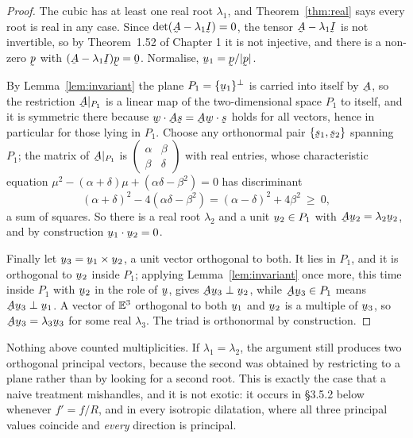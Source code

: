 \begin{proof}
The cubic  has at least one real root $\lambda_{1}$, and
Theorem~\ref{thm:real} says every root is real in any case. Since
$\det(\bA-\lambda_{1}\I)=0$, the tensor $\bA-\lambda_{1}\I$ is not
invertible, so by Theorem~1.52 of Chapter 1 it is not injective, and there
is a non-zero $\bp$ with $(\bA-\lambda_{1}\I)\bp=\bze$. Normalise,
$\bu_{1}=\bp/|\bp|$.

By Lemma~\ref{lem:invariant} the plane $P_{1}=\{\bu_{1}\}^{\perp}$ is
carried into itself by $\bA$, so the restriction $\bA|_{P_{1}}$ is a linear
map of the two-dimensional space $P_{1}$ to itself, and it is symmetric
there because $\ip{\bw}{\bA\bs}=\ip{\bA\bw}{\bs}$ holds for all vectors,
hence in particular for those lying in $P_{1}$. Choose any orthonormal
pair $\{\bs_{1},\bs_{2}\}$ spanning $P_{1}$; the matrix of $\bA|_{P_{1}}$
is $\begin{pmatrix}\alpha&\beta\\\beta&\delta\end{pmatrix}$ with real
entries, whose characteristic equation
$\mu^{2}-(\alpha+\delta)\mu+(\alpha\delta-\beta^{2})=0$ has discriminant
\[
   (\alpha+\delta)^{2}-4(\alpha\delta-\beta^{2})
   =(\alpha-\delta)^{2}+4\beta^{2}\ \ge\ 0 ,
\]
a sum of squares. So there is a real root $\lambda_{2}$ and a unit
$\bu_{2}\in P_{1}$ with $\bA\bu_{2}=\lambda_{2}\bu_{2}$, and by
construction $\ip{\bu_{1}}{\bu_{2}}=0$.

Finally let $\bu_{3}=\bu_{1}\times\bu_{2}$, a unit vector orthogonal to
both. It lies in $P_{1}$, and it is orthogonal to $\bu_{2}$ inside
$P_{1}$; applying Lemma~\ref{lem:invariant} once more, this time inside
$P_{1}$ with $\bu_{2}$ in the role of $\bu$, gives
$\bA\bu_{3}\perp\bu_{2}$, while $\bA\bu_{3}\in P_{1}$ means
$\bA\bu_{3}\perp\bu_{1}$. A vector of $\mathbb{E}^{3}$ orthogonal to both $\bu_{1}$
and $\bu_{2}$ is a multiple of $\bu_{3}$, so $\bA\bu_{3}=\lambda_{3}
\bu_{3}$ for some real $\lambda_{3}$. The triad is orthonormal by
construction.
\end{proof}

\begin{remark}
\label{rem:proofbuys}
Nothing above counted multiplicities. If $\lambda_{1}=\lambda_{2}$, the
argument still produces two orthogonal principal vectors, because the
second was obtained by restricting to a plane rather than by looking for a
second root. This is exactly the case that a naive treatment mishandles,
and it is not exotic: it occurs in \S3.5.2 below whenever $f'=f/R$, and in
every isotropic dilatation, where all three principal values coincide and
\emph{every} direction is principal.
\end{remark}

